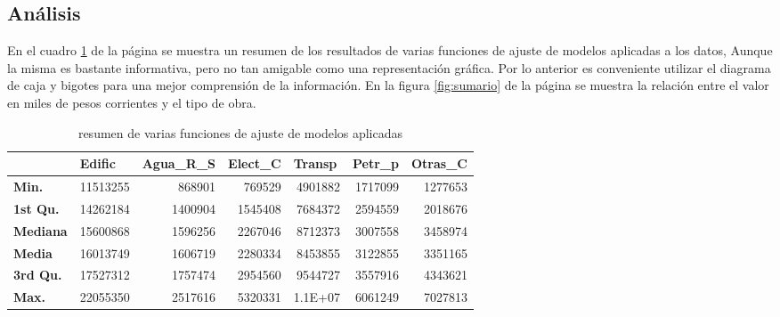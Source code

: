 \documentclass{article}
\begin{document}
 \subsection{Análisis}
En el cuadro \ref{tab:sumario} de la página \pageref{tab:sumario} se muestra un resumen de los resultados de varias funciones de ajuste de modelos aplicadas a los datos, Aunque la misma es bastante informativa, pero no tan amigable como una representación gráfica. Por lo anterior es conveniente utilizar el diagrama de caja y bigotes para una mejor comprensión de la información. En la figura \ref{fig:sumario} de la página \pageref{fig:sumario} se muestra la relación entre el valor en miles de pesos corrientes y el tipo de obra.
\begin{table}[H]
  \centering
  \caption{resumen de varias funciones de ajuste de modelos aplicadas}
    \begin{tabular}{lrrrrrr}
    \toprule
          & \multicolumn{1}{l}{\textbf{     Edific               }} & \multicolumn{1}{l}{\textbf{Agua\_R\_S   }} & \multicolumn{1}{l}{\textbf{Elect\_C       }} & \multicolumn{1}{l}{\textbf{Transp       }} & \multicolumn{1}{l}{\textbf{Petr\_p       }} & \multicolumn{1}{l}{\textbf{Otras\_C       }} \\
    \midrule
    \textbf{Min.} & 11513255 & 868901 & 769529 & 4901882 & 1717099 & 1277653 \\
    \textbf{ 1st Qu.} & 14262184 & 1400904 & 1545408 & 7684372 & 2594559 & 2018676 \\
    \textbf{Mediana} & 15600868 & 1596256 & 2267046 & 8712373 & 3007558 & 3458974 \\
    \textbf{Media} & 16013749 & 1606719 & 2280334 & 8453855 & 3122855 & 3351165 \\
    \textbf{ 3rd Qu.} & 17527312 & 1757474 & 2954560 & 9544727 & 3557916 & 4343621 \\
    \textbf{ Max.} & 22055350 & 2517616 & 5320331 & 1.1E+07 & 6061249 & 7027813 \\
    \bottomrule
    \end{tabular}%
  \label{tab:sumario}%
 \vspace{-0.5cm}
\end{table}%
\end{document}
